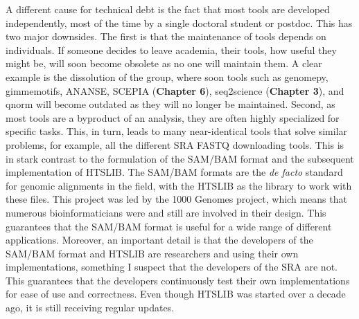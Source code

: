 A different cause for technical debt is the fact that most tools are developed independently, most of the time by a single doctoral student or postdoc. This has two major downsides. The first is that the maintenance of tools depends on individuals. If someone decides to leave academia, their tools, how useful they might be, will soon become obsolete as no one will maintain them. A clear example is the dissolution of the  group, where soon tools such as genomepy\cite{Frlich2023}, gimmemotifs\cite{Bruse_2018}, ANANSE\cite{Xu_2020}, SCEPIA (\textbf{Chapter 6}), seq2science\cite{seq2science} (\textbf{Chapter 3}), and qnorm\cite{qnorm} will become outdated as they will no longer be maintained. Second, as most tools are a byproduct of an analysis, they are often highly specialized for specific tasks. This, in turn, leads to many near-identical tools that solve similar problems, for example, all the different SRA FASTQ downloading tools. This is in stark contrast to the formulation of the SAM/BAM format\cite{Li2009} and the subsequent implementation of HTSLIB\cite{Bonfield2021}. The SAM/BAM formats are the \textit{de facto} standard for genomic alignments in the field, with the HTSLIB as the library to work with these files. This project was led by the 1000 Genomes project, which means that numerous bioinformaticians were and still are involved in their design. This guarantees that the SAM/BAM format is useful for a wide range of different applications. Moreover, an important detail is that the developers of the SAM/BAM format and HTSLIB are researchers and using their own implementations, something I suspect that the developers of the SRA are not. This guarantees that the developers continuously test their own implementations for ease of use and correctness. Even though HTSLIB was started over a decade ago, it is still receiving regular updates. 

